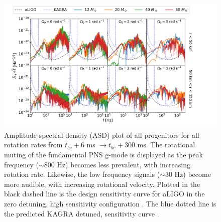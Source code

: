 \documentclass[twocolumn,times]{aastex62}  %
\begin{document}
\begin{figure}[t!]
  \centering     %
  \includegraphics[width=\textwidth]{figures/tbe6tbe300_combined_M1_long.pdf}
  \caption{Amplitude spectral density (ASD) plot of all progenitors for all rotation rates from $t_{be}+6$ ms $\rightarrow t_{be}+300$ ms.  The rotational muting of the fundamental PNS g-mode is displayed as the peak frequency ($\sim 800$ Hz) becomes less prevalent, with increasing rotation rate.  Likewise, the low frequency signals ($\sim30$ Hz) become more audible, with increasing rotational velocity.  Plotted in the black dashed line is the design sensitivity curve for aLIGO in the zero detuning, high sensitivity configuration \citep{barsotti:2018}.  The blue dotted line is the predicted KAGRA detuned, sensitivity curve \citep{komari:2017}.}
  \label{fig:spetra_long}
\end{figure}
\end{document}
